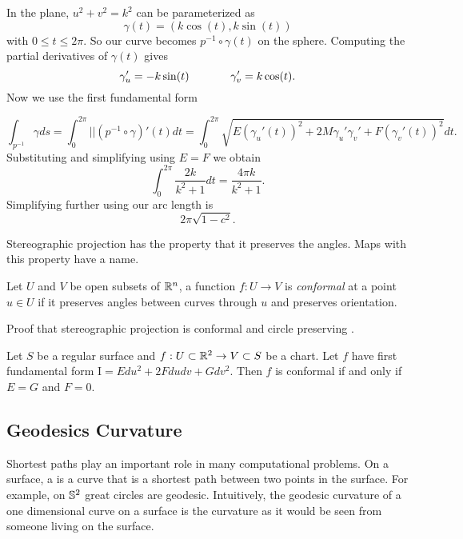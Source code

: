 \begin{example}
In the plane, $u^2+v^2=k^2$ can be parameterized
as $$\gamma(t)=(k\cos(t),k\sin(t))$$ with $0\leq t\leq 2\pi.$
So our curve becomes $p^{-1}\circ \gamma(t)$ on the sphere.
Computing the partial derivatives of $\gamma(t)$ gives
$$\gamma_u'=-k\sin(t)\hspace{1.3cm}  \gamma_v'=k\cos(t).$$
Now we use the first fundamental form

$$\int_{p^{-1}}\gamma ds=\int_{0}^{2\pi} ||(p^{-1}\circ \gamma)'(t)dt=\int_0^{2\pi}\sqrt{E(\gamma_u'(t))^2+2M\gamma_u'\gamma_v'+
F(\gamma_v'(t))^2}dt.$$
Substituting and simplifying using $E=F$ we obtain
$$\int_0^{2\pi}\frac{2k}{k^2+1}dt=\frac{4\pi k}{k^2+1}.$$
Simplifying further using   our arc length is
$$2\pi\sqrt{1-c^2}.$$

\end{example}

Stereographic projection has the property that it preserves the angles.
Maps with this property have a name.
\begin{definition}[Conformal]\label{def:conformal}
	Let $U$ and $V$ be open subsets of $\mathbb{R}^n$, a function $f:U\to V$ is
	\emph{conformal} at a point $u\in U$ if it preserves angles between curves
	through $u$ and preserves orientation.
\end{definition}
Proof that stereographic projection is conformal and circle preserving \cite{hilbert-imagination}.

\begin{theorem}\label{thm:first-conformal}
	Let $S$ be a regular surface and $f:U\subset \mathbb{R}^2 \to V\subset S$ be a chart.
	Let $f$ have first fundamental form $\mathrm{I}=Edu^2+2Fdudv +Gdv^2$.
	Then $f$ is conformal if and only if $E=G$ and $F=0.$
\end{theorem}


\subsection{Geodesics Curvature}

Shortest paths play an important role in many computational problems.
On a surface, a  is a curve that is a shortest path
between two points in the surface. 
For example, on $\mathbb{S}^2$ great circles are geodesic.
Intuitively, the geodesic curvature of a one dimensional curve on a surface
is the curvature as it would be seen from someone living on the surface.


